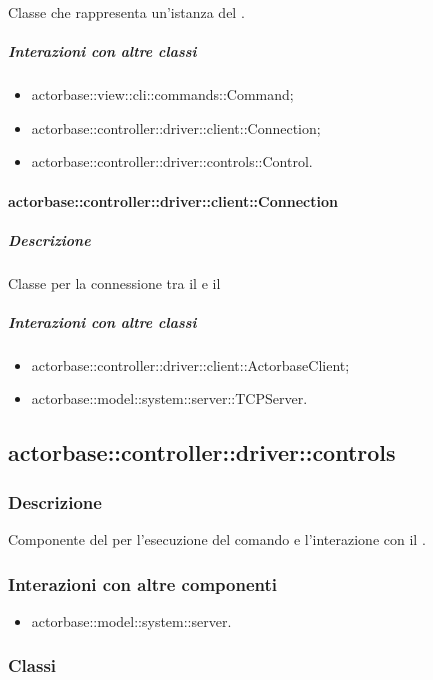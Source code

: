 \documentclass{scalatekids-article}
\begin{document}
Classe che rappresenta un'istanza del .

\subparagraph{Interazioni con altre classi}

\begin{itemize}
\item actorbase::view::cli::commands::Command;
\item actorbase::controller::driver::client::Connection;
\item actorbase::controller::driver::controls::Control.
\end{itemize}

\paragraph{actorbase::controller::driver::client::Connection}

\subparagraph{Descrizione}

Classe per la connessione tra il  e il 

\subparagraph{Interazioni con altre classi}
\begin{itemize}
\item actorbase::controller::driver::client::ActorbaseClient;
\item actorbase::model::system::server::TCPServer.
\end{itemize}

\subsection{actorbase::controller::driver::controls}

\subsubsection{Descrizione}

Componente del  per l'esecuzione del comando e l'interazione con il .

\subsubsection{Interazioni con altre componenti}

\begin{itemize}
\item actorbase::model::system::server.
\end{itemize}

\subsubsection{Classi}
\end{document}
